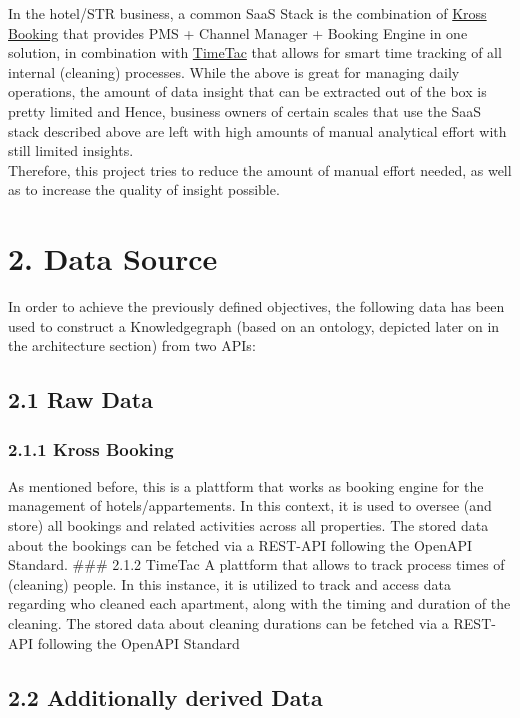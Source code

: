 In the hotel/STR business, a common SaaS Stack is the combination of
\href{https://www.krossbooking.com/en}{Kross Booking} that provides PMS
+ Channel Manager + Booking Engine in one solution, in combination with
\href{https://www.timetac.com/en/}{TimeTac} that allows for smart time
tracking of all internal (cleaning) processes. While the above is great
for managing daily operations, the amount of data insight that can be
extracted out of the box is pretty limited and Hence, business owners of
certain scales that use the SaaS stack described above are left with
high amounts of manual analytical effort with still limited insights.\\
Therefore, this project tries to reduce the amount of manual effort
needed, as well as to increase the quality of insight possible.

\section{2. Data Source}\label{data-source}

In order to achieve the previously defined objectives, the following
data has been used to construct a Knowledgegraph (based on an ontology,
depicted later on in the architecture section) from two APIs:

\subsection{2.1 Raw Data}\label{raw-data}

\subsubsection{2.1.1 Kross Booking}\label{kross-booking}

As mentioned before, this is a plattform that works as booking engine
for the management of hotels/appartements. In this context, it is used
to oversee (and store) all bookings and related activities across all
properties. The stored data about the bookings can be fetched via a
REST-API following the OpenAPI Standard. \#\#\# 2.1.2 TimeTac A
plattform that allows to track process times of (cleaning) people. In
this instance, it is utilized to track and access data regarding who
cleaned each apartment, along with the timing and duration of the
cleaning. The stored data about cleaning durations can be fetched via a
REST-API following the OpenAPI Standard

\subsection{2.2 Additionally derived
Data}\label{additionally-derived-data}

